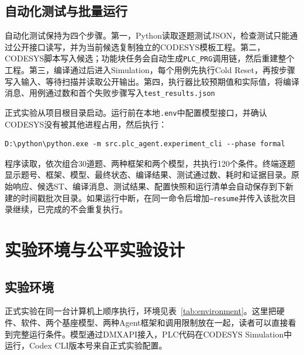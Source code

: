 \documentclass[UTF8,a4paper,zihao=-4]{ctexart}
\begin{document}
\subsection{自动化测试与批量运行}

自动化测试保持为四个步骤。第一，Python读取逐题测试JSON，检查测试只能通过公开接口读写，并为当前候选复制独立的CODESYS模板工程。第二，CODESYS脚本写入候选；功能块任务会自动生成\texttt{PLC\_PRG}调用链，然后重建整个工程。第三，编译通过后进入Simulation，每个用例先执行Cold Reset，再按步骤写入输入、等待扫描并读取公开输出。第四，执行器比较预期值和实际值，将编译消息、用例通过数和首个失败步骤写入\texttt{test\_results.json}

正式实验从项目根目录启动。运行前在本地\texttt{.env}中配置模型接口，并确认CODESYS没有被其他进程占用，然后执行：
\begin{verbatim}
D:\python\python.exe -m src.plc_agent.experiment_cli --phase formal
\end{verbatim}
程序读取，依次组合30道题、两种框架和两个模型，共执行120个条件。终端逐题显示题号、框架、模型、最终状态、编译结果、测试通过数、耗时和证据目录。原始响应、候选ST、编译消息、测试结果、配置快照和运行清单会自动保存到下新建的时间戳批次目录。如果运行中断，在同一命令后增加\texttt{--resume}并传入该批次目录继续，已完成的不会重复执行。


\section{实验环境与公平实验设计}

\subsection{实验环境}
正式实验在同一台计算机上顺序执行，环境见表~\ref{tab:environment}。这里把硬件、软件、两个基座模型、两种Agent框架和调用限制放在一起，读者可以直接看到完整运行条件。模型通过DMXAPI接入，PLC代码在CODESYS Simulation中运行，Codex CLI版本号来自正式实验配置。
\end{document}
